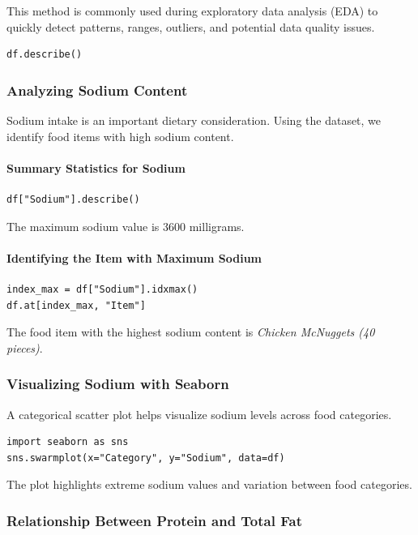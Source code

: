 \documentclass{article}
\begin{document}
This method is commonly used during exploratory data analysis (EDA) to quickly detect patterns, ranges, outliers, and potential data quality issues.

\begin{verbatim}
df.describe()
\end{verbatim}


\subsubsection{Analyzing Sodium Content}

Sodium intake is an important dietary consideration. Using the dataset, we identify food items with high sodium content.

\paragraph{Summary Statistics for Sodium}
\begin{verbatim}
df["Sodium"].describe()
\end{verbatim}
The maximum sodium value is 3600 milligrams.

\paragraph{Identifying the Item with Maximum Sodium}
\begin{verbatim}
index_max = df["Sodium"].idxmax()
df.at[index_max, "Item"]
\end{verbatim}
The food item with the highest sodium content is \textit{Chicken McNuggets (40 pieces)}.

\subsubsection{Visualizing Sodium with Seaborn}

A categorical scatter plot helps visualize sodium levels across food categories.

\begin{verbatim}
import seaborn as sns
sns.swarmplot(x="Category", y="Sodium", data=df)
\end{verbatim}
The plot highlights extreme sodium values and variation between food categories.

\subsubsection{Relationship Between Protein and Total Fat}
\end{document}
